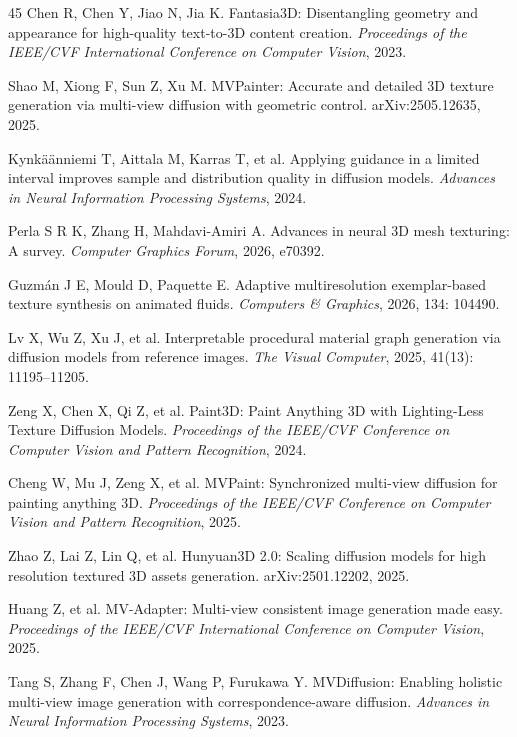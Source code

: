 \documentclass[times,twocolumn,final]{elsarticle}
\begin{document}
\begin{thebibliography}{45}
Chen R, Chen Y, Jiao N, Jia K. Fantasia3D: Disentangling geometry and appearance for high-quality text-to-3D content creation. \textit{Proceedings of the IEEE/CVF International Conference on Computer Vision}, 2023.

Shao M, Xiong F, Sun Z, Xu M. MVPainter: Accurate and detailed 3D texture generation via multi-view diffusion with geometric control. arXiv:2505.12635, 2025.

Kynk\"a\"anniemi T, Aittala M, Karras T, et al. Applying guidance in a limited interval improves sample and distribution quality in diffusion models. \textit{Advances in Neural Information Processing Systems}, 2024.

Perla S R K, Zhang H, Mahdavi-Amiri A. Advances in neural 3D mesh texturing: A survey. \textit{Computer Graphics Forum}, 2026, e70392.

Guzm\'an J E, Mould D, Paquette E. Adaptive multiresolution exemplar-based texture synthesis on animated fluids. \textit{Computers \& Graphics}, 2026, 134: 104490.

Lv X, Wu Z, Xu J, et al. Interpretable procedural material graph generation via diffusion models from reference images. \textit{The Visual Computer}, 2025, 41(13): 11195--11205.

Zeng X, Chen X, Qi Z, et al. Paint3D: Paint Anything 3D with Lighting-Less Texture Diffusion Models. \textit{Proceedings of the IEEE/CVF Conference on Computer Vision and Pattern Recognition}, 2024.

Cheng W, Mu J, Zeng X, et al. MVPaint: Synchronized multi-view diffusion for painting anything 3D. \textit{Proceedings of the IEEE/CVF Conference on Computer Vision and Pattern Recognition}, 2025.

Zhao Z, Lai Z, Lin Q, et al. Hunyuan3D 2.0: Scaling diffusion models for high resolution textured 3D assets generation. arXiv:2501.12202, 2025.

Huang Z, et al. MV-Adapter: Multi-view consistent image generation made easy. \textit{Proceedings of the IEEE/CVF International Conference on Computer Vision}, 2025.

Tang S, Zhang F, Chen J, Wang P, Furukawa Y. MVDiffusion: Enabling holistic multi-view image generation with correspondence-aware diffusion. \textit{Advances in Neural Information Processing Systems}, 2023.


\end{thebibliography}
\end{document}
